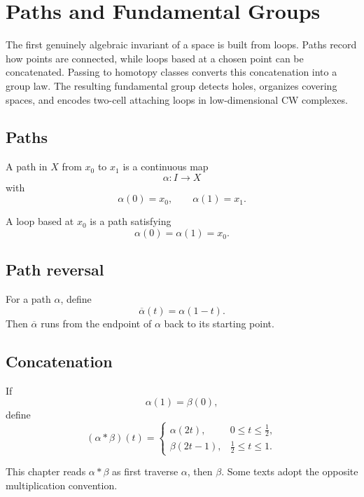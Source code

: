 ﻿\chapter{Paths and Fundamental Groups}
\label{ch:viii09-paths-fundamental-groups}

The first genuinely algebraic invariant of a space is built from loops.  Paths
record how points are connected, while loops based at a chosen point can be
concatenated.  Passing to homotopy classes converts this concatenation into a
group law.  The resulting fundamental group detects holes, organizes covering
spaces, and encodes two-cell attaching loops in low-dimensional CW complexes.

\section{Paths}

\begin{definition}[Path]
\label{def:viii09-path}
A path in \(X\) from \(x_0\) to \(x_1\) is a continuous map
\[
\alpha:I\to X
\]
with
\[
\alpha(0)=x_0,
\qquad
\alpha(1)=x_1.
\]
\end{definition}

A loop based at \(x_0\) is a path satisfying
\[
\alpha(0)=\alpha(1)=x_0.
\]

\section{Path reversal}

For a path \(\alpha\), define
\[
\overline\alpha(t)=\alpha(1-t).
\]
Then \(\overline\alpha\) runs from the endpoint of \(\alpha\) back to its
starting point.

\section{Concatenation}

If
\[
\alpha(1)=\beta(0),
\]
define
\[
(\alpha*\beta)(t)=
\begin{cases}
\alpha(2t),&0\le t\le\frac12,\\
\beta(2t-1),&\frac12\le t\le1.
\end{cases}
\]

\begin{warning}[Convention]
\label{warn:viii09-convention}
This chapter reads \(\alpha*\beta\) as first traverse \(\alpha\), then
\(\beta\).  Some texts adopt the opposite multiplication convention.
\end{warning}

